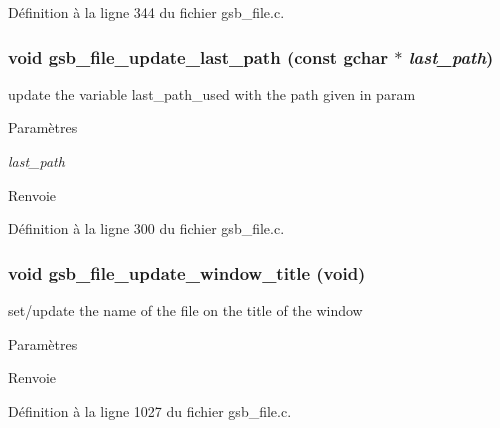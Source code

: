 Définition à la ligne 344 du fichier gsb\_\-file.c.

\subsubsection[{gsb\_\-file\_\-update\_\-last\_\-path}]{\setlength{\rightskip}{0pt plus 5cm}void gsb\_\-file\_\-update\_\-last\_\-path (const gchar $\ast$ {\em last\_\-path})}\label{gsb__file_8h_abea90088f86f05e8386739483e16b380}
update the variable last\_\-path\_\-used with the path given in param


\begin{DoxyParams}{Paramètres}
\item[{\em last\_\-path}]\end{DoxyParams}
\begin{DoxyReturn}{Renvoie}

\end{DoxyReturn}


Définition à la ligne 300 du fichier gsb\_\-file.c.

\subsubsection[{gsb\_\-file\_\-update\_\-window\_\-title}]{\setlength{\rightskip}{0pt plus 5cm}void gsb\_\-file\_\-update\_\-window\_\-title (void)}\label{gsb__file_8h_a20a017f7b890e6fc0cd7a8c86beeb1dc}
set/update the name of the file on the title of the window


\begin{DoxyParams}{Paramètres}
\item[{\em }]\end{DoxyParams}
\begin{DoxyReturn}{Renvoie}

\end{DoxyReturn}


Définition à la ligne 1027 du fichier gsb\_\-file.c.

